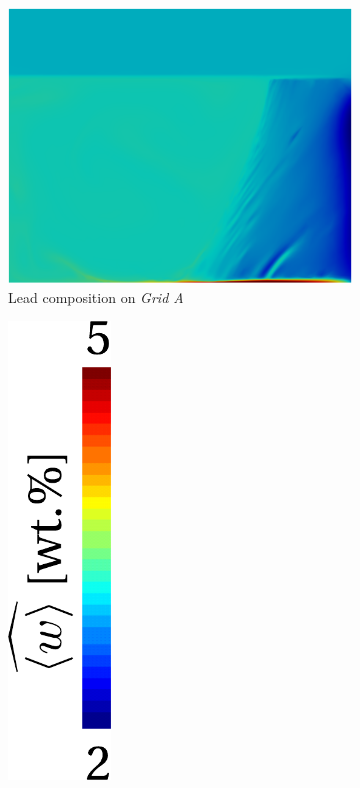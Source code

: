 \begin{figure}[H]
\centering
  \begin{subfigure}[t]{0.4\textwidth}
    \centering
  \includegraphics[width=\textwidth]{Chapter5/Graphics/2d/1200s_compo.png}
  \caption{Lead composition on \emph{Grid A}}
    \label{fig:1200s_compo}
  \end{subfigure}
  \begin{subfigure}[t]{0.15\textwidth}
    \centering
  \includegraphics[width=0.3\textwidth]{Chapter5/Graphics/2d/colorbar_w.pdf}

\end{subfigure}
\end{figure}
